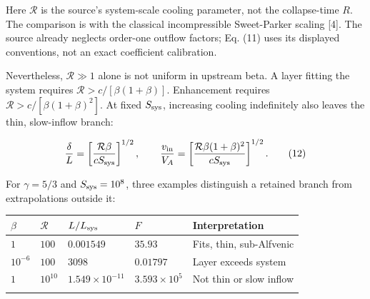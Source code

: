Here \(\mathcal R\) is the source's system-scale cooling parameter, not
the collapse-time \(R\). The comparison is with the classical
incompressible Sweet-Parker scaling {[}4{]}. The source already neglects
order-one outflow factors; Eq. (11) uses its displayed conventions, not
an exact coefficient calibration.

Nevertheless, \(\mathcal R\gg1\) alone is not uniform in upstream beta.
A layer fitting the system requires \(\mathcal R>c/[\beta(1+\beta)]\).
Enhancement requires \(\mathcal R>c/[\beta(1+\beta)^2]\). At fixed
\(S_{\rm sys}\), increasing cooling indefinitely also leaves the thin,
slow-inflow branch:

\[
\frac{\delta}{L}=\left[\frac{\mathcal R\beta}{cS_{\rm sys}}\right]^{1/2},
\qquad
\frac{v_{\rm in}}{V_A}=\left[\frac{\mathcal R\beta(1+\beta)^2}
{cS_{\rm sys}}\right]^{1/2}. \tag{12}
\]

For \(\gamma=5/3\) and \(S_{\rm sys}=10^8\), three examples distinguish
a retained branch from extrapolations outside it:


\begin{minipage}{\linewidth}\small
\begin{tabular}{@{}
  >{\raggedleft\arraybackslash}p{}
  >{\raggedleft\arraybackslash}p{}
  >{\raggedleft\arraybackslash}p{}
  >{\raggedleft\arraybackslash}p{}
  >{\raggedright\arraybackslash}p{}@{}}
\toprule\noalign{}
\begin{minipage}[b]{\linewidth}\raggedleft
\(\beta\)
\end{minipage} & \begin{minipage}[b]{\linewidth}\raggedleft
\(\mathcal R\)
\end{minipage} & \begin{minipage}[b]{\linewidth}\raggedleft
\(L/L_{\rm sys}\)
\end{minipage} & \begin{minipage}[b]{\linewidth}\raggedleft
\(F\)
\end{minipage} & \begin{minipage}[b]{\linewidth}\raggedright
Interpretation
\end{minipage} \\
\midrule\noalign{}
\(1\) & \(100\) & \(0.001549\) & \(35.93\) & Fits, thin, sub-Alfvenic \\
\(10^{-6}\) & \(100\) & \(3098\) & \(0.01797\) & Layer exceeds system \\
\(1\) & \(10^{10}\) & \(1.549\times10^{-11}\) & \(3.593\times10^5\) &
Not thin or slow inflow \\
\bottomrule\noalign{}
\end{tabular}
\end{minipage}


